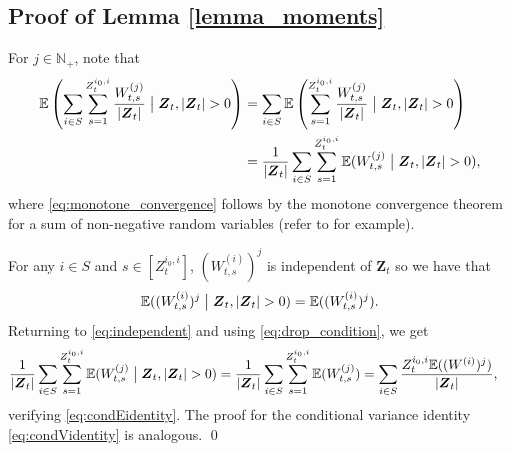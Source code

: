 \documentclass[preprint,3p,12pt]{elsarticle}
\theoremstyle{definition}
\newcommand{\Var}{\operatorname{Var}}
\newcommand{\z}[1][i_0, i]{Z_t^{#1}}
\begin{document}
\subsection{Proof of Lemma \ref{lemma_moments}}\label{sums_W}
For $j \in \mathbb{N}_+$, note that %
    \begin{align}
        \mathbb{E}\left(\sum_{i \in S}\sum_{s=1}^{\z}  \frac{W_{t, s}^{(j)}}{|\boldsymbol{Z}_t|}\bigm|  \boldsymbol{Z}_t, |\boldsymbol{Z}_t| > 0 \right) 
        &= \sum_{i \in S}\mathbb{E}\left(\sum_{s=1}^{\z}\frac{W_{t, s}^{(j)}}{|\boldsymbol{Z}_t|}\bigm|  \boldsymbol{Z}_t, |\boldsymbol{Z}_t| > 0\right) \label{eq:monotone_convergence} \\
        &= \frac{1}{\vert\boldsymbol{Z}_t\vert}\sum_{i \in S}\sum_{s=1}^{\z}\mathbb{E}(W_{t, s}^{(j)}\bigm|  \boldsymbol{Z}_t, |\boldsymbol{Z}_t| > 0), \label{eq:independent}
      \end{align}
      where \eqref{eq:monotone_convergence} follows by the monotone convergence theorem for a sum of non-negative random variables (refer to \cite[Thm.\ 8.1, p.\ 164]{kallenberg} for example).

      For any $i \in S$ and $s \in [\z]$, $(W_{t,s}^{(i)})^j$ is independent of $\boldsymbol{Z}_t$ so we have that
      \begin{equation}
      \mathbb{E}((W_{t,s}^{(i)})^j\bigm|  \boldsymbol{Z}_t, |\boldsymbol{Z}_t| > 0) = \mathbb{E}((W_{t,s}^{(i)})^j) \label{eq:drop_condition}.
      \end{equation}
      Returning to \eqref{eq:independent} and using \eqref{eq:drop_condition}, we get
      \begin{align*}
       \frac{1}{\vert \boldsymbol{Z}_t\vert}\sum_{i \in S}\sum_{s=1}^{\z}\mathbb{E}(W_{t, s}^{(j)}\bigm|  \boldsymbol{Z}_t, |\boldsymbol{Z}_t| > 0) 
        &= \frac{1}{\vert \boldsymbol{Z}_t\vert}\sum_{i \in S}\sum_{s=1}^{\z}\mathbb{E}(W_{t, s}^{(j)}) 
        =  \sum_{i \in S}\frac{\z\mathbb{E}( (W^{(i)})^j)}{\vert\boldsymbol{Z}_t\vert},
    \end{align*} 
verifying \eqref{eq:condEidentity}. The proof for the conditional variance identity \eqref{eq:condVidentity} is analogous. \qed
\end{document}

